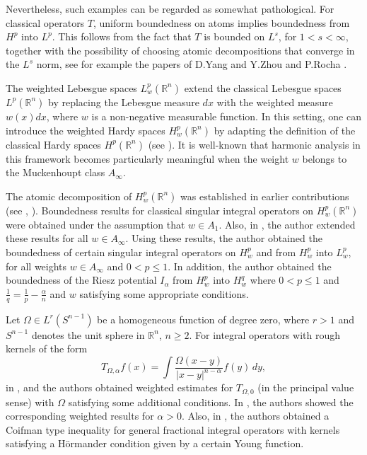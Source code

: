\documentclass[a4paper,12pt,reqno]{amsart}
\numberwithin{equation}{section}
\begin{document}
	Nevertheless, such examples can be regarded as somewhat pathological. 
	For classical operators $T$, uniform boundedness on atoms implies boundedness from $H^p$ into $L^p$. 
	This follows from the fact that $T$ is bounded on $L^s$, for $1<s<\infty$, together with the possibility of choosing atomic decompositions that converge in the $L^s$ norm, see for example the papers of D.\@ Yang and Y.\@ Zhou \cite{YZ} and P.\@ Rocha \cite{Rocha-2}.
	
	The weighted Lebesgue spaces $L^p_{w}(\mathbb{R}^n)$ extend the classical Lebesgue spaces $L^p(\mathbb{R}^n)$ by replacing the Lebesgue measure $dx$ with the weighted measure $w(x)dx$, where $w$ is a non-negative measurable function. 
	In this setting, one can introduce the weighted Hardy spaces $H^p_{w}(\mathbb{R}^n)$ by adapting the definition of the classical Hardy spaces $H^p(\mathbb{R}^n)$ (see \cite{ST}). 
	It is well-known that harmonic analysis in this framework becomes particularly meaningful when the weight $w$ belongs to the Muckenhoupt class $A_{\infty}$.
	
	The atomic decomposition of $H^p_{w}(\mathbb{R}^n)$ was established in earlier contributions (see \cite{GC}, \cite{ST}). 
	Boundedness results for classical singular integral operators on $H^p_{w}(\mathbb{R}^n)$ were obtained under the assumption that $w \in A_1$. 
	Also, in \cite{Rocha-3}, the author extended these results for all $w \in A_{\infty}$. 
	Using these results, the author obtained the boundedness of certain singular integral operators on $H^p_w$ and from $H^p_w$	into $L^p_w$, for all weights $w \in A_{\infty}$ and $0<p \leq 1$. In addition, the author obtained the boundedness of the Riesz potential $I_{\alpha}$ from $H^p_w$ into $H^q_w$ where $0<p \leq 1$ and $\frac{1}{q}=\frac{1}{p} - \frac{\alpha}{n}$ and $w$ satisfying some appropriate conditions.
	
	
	Let $\Omega \in L^r(S^{n-1})$ be a homogeneous function of degree zero, where $r>1$ and $S^{n-1}$ denotes the unit sphere in $\mathbb{R}^n$, $n\geq 2$.
	For integral operators with rough kernels of the form	
	$$
	T_{\Omega, \alpha} f(x)=\int  \frac{\Omega(x-y)}{|x-y|^{n-\alpha}} f(y) \, dy,
	$$
	in \cite{KuW}, \cite{Du} and \cite{Wa}  the authors obtained weighted estimates for $T_{\Omega, 0}$ (in the principal  value sense) with $\Omega$ satisfying some additional conditions.  
	In \cite{DL}, the authors showed the corresponding weighted results for $\alpha>0$. 
	Also, in \cite {BLRi}, the authors obtained a Coifman type inequality for general fractional integral operators with kernels satisfying a H\"{o}rmander condition given by a certain Young function.
	
\end{document}
